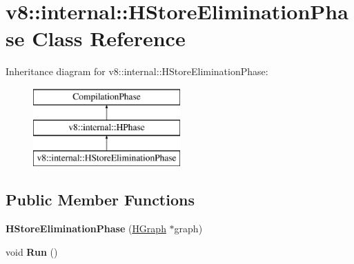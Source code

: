 \hypertarget{classv8_1_1internal_1_1_h_store_elimination_phase}{}\section{v8\+:\+:internal\+:\+:H\+Store\+Elimination\+Phase Class Reference}
\label{classv8_1_1internal_1_1_h_store_elimination_phase}
Inheritance diagram for v8\+:\+:internal\+:\+:H\+Store\+Elimination\+Phase\+:\begin{figure}[H]
\begin{center}
\leavevmode
\includegraphics[height=3.000000cm]{classv8_1_1internal_1_1_h_store_elimination_phase}
\end{center}
\end{figure}
\subsection*{Public Member Functions}
\begin{DoxyCompactItemize}
\item 
{\bfseries H\+Store\+Elimination\+Phase} (\hyperlink{classv8_1_1internal_1_1_h_graph}{H\+Graph} $\ast$graph)\hypertarget{classv8_1_1internal_1_1_h_store_elimination_phase_a4ebd679252c7a3a4f2af3c787a46d573}{}\label{classv8_1_1internal_1_1_h_store_elimination_phase_a4ebd679252c7a3a4f2af3c787a46d573}

\item 
void {\bfseries Run} ()\hypertarget{classv8_1_1internal_1_1_h_store_elimination_phase_ab6ed64dc56221ae3b84f15c082890529}{}\label{classv8_1_1internal_1_1_h_store_elimination_phase_ab6ed64dc56221ae3b84f15c082890529}

\end{DoxyCompactItemize}
